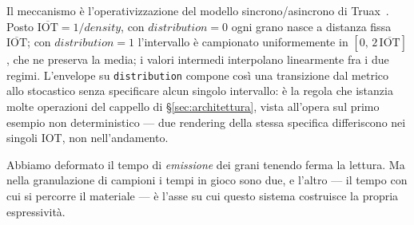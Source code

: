 Il meccanismo è l'operativizzazione del modello sincrono/asincrono di
Truax~\cite{Truax1988}. Posto $\overline{\mathrm{IOT}} = 1/\mathit{density}$,
con $\mathit{distribution}=0$ ogni grano nasce a distanza fissa
$\overline{\mathrm{IOT}}$; con $\mathit{distribution}=1$ l'intervallo è
campionato uniformemente in $[0,\,2\,\overline{\mathrm{IOT}}]$, che ne
preserva la media; i valori intermedi interpolano linearmente fra i due
regimi. L'envelope su \texttt{distribution} compone così una transizione
dal metrico allo stocastico senza specificare alcun singolo intervallo:
è la regola che istanzia molte operazioni del cappello di
\S\ref{sec:architettura}, vista all'opera sul primo esempio non
deterministico --- due rendering della stessa specifica differiscono nei
singoli IOT, non nell'andamento.

Abbiamo deformato il tempo di \emph{emissione} dei grani tenendo ferma
la lettura. Ma nella granulazione di campioni i tempi in gioco sono due,
e l'altro --- il tempo con cui si percorre il materiale --- è l'asse su
cui questo sistema costruisce la propria espressività.

